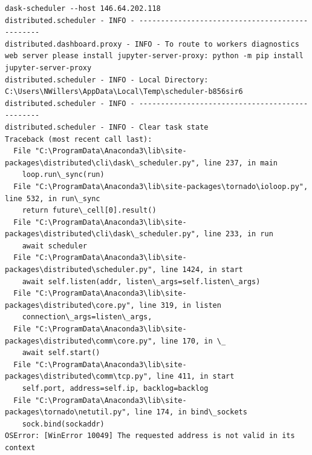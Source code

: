 \begin{lstlisting}[style=tinysize]
dask-scheduler --host 146.64.202.118
distributed.scheduler - INFO - -----------------------------------------------
distributed.dashboard.proxy - INFO - To route to workers diagnostics web server please install jupyter-server-proxy: python -m pip install jupyter-server-proxy
distributed.scheduler - INFO - Local Directory: C:\Users\NWillers\AppData\Local\Temp\scheduler-b856sir6
distributed.scheduler - INFO - -----------------------------------------------
distributed.scheduler - INFO - Clear task state
Traceback (most recent call last):
  File "C:\ProgramData\Anaconda3\lib\site-packages\distributed\cli\dask\_scheduler.py", line 237, in main
    loop.run\_sync(run)
  File "C:\ProgramData\Anaconda3\lib\site-packages\tornado\ioloop.py", line 532, in run\_sync
    return future\_cell[0].result()
  File "C:\ProgramData\Anaconda3\lib\site-packages\distributed\cli\dask\_scheduler.py", line 233, in run
    await scheduler
  File "C:\ProgramData\Anaconda3\lib\site-packages\distributed\scheduler.py", line 1424, in start
    await self.listen(addr, listen\_args=self.listen\_args)
  File "C:\ProgramData\Anaconda3\lib\site-packages\distributed\core.py", line 319, in listen
    connection\_args=listen\_args,
  File "C:\ProgramData\Anaconda3\lib\site-packages\distributed\comm\core.py", line 170, in \_
    await self.start()
  File "C:\ProgramData\Anaconda3\lib\site-packages\distributed\comm\tcp.py", line 411, in start
    self.port, address=self.ip, backlog=backlog
  File "C:\ProgramData\Anaconda3\lib\site-packages\tornado\netutil.py", line 174, in bind\_sockets
    sock.bind(sockaddr)
OSError: [WinError 10049] The requested address is not valid in its context
\end{lstlisting}





